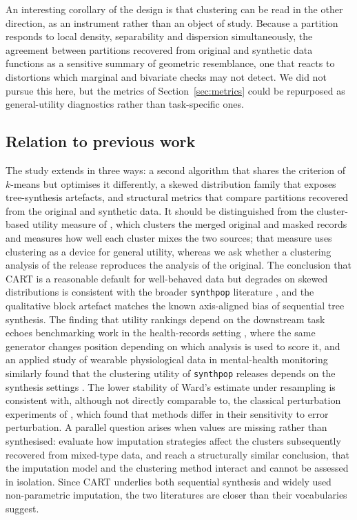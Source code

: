 \documentclass[pdflatex,referee]{sn-jnl}
\begin{document}
An interesting corollary of the design is that clustering can be read in the
other direction, as an instrument rather than an object of study. Because a
partition responds to local density, separability and dispersion
simultaneously, the agreement between partitions recovered from original and
synthetic data functions as a sensitive summary of geometric resemblance, one
that reacts to distortions which marginal and bivariate checks may not detect.
We did not pursue this here, but the metrics of Section~\ref{sec:metrics} could
be repurposed as general-utility diagnostics rather than task-specific ones.

\subsection{Relation to previous work}

The study extends \citet{chen2025} in three ways: a second algorithm that
shares the criterion of $k$-means but optimises it differently, a skewed
distribution family that exposes tree-synthesis artefacts, and structural
metrics that compare partitions recovered from the original and synthetic
data. It should be distinguished from the cluster-based utility measure of
\citet{woo2009}, which clusters the merged original and masked records and
measures how well each cluster mixes the two sources; that measure uses
clustering as a device for general utility, whereas we ask whether a
clustering analysis of the release reproduces the analysis of the original.
The conclusion that CART is a reasonable default for well-behaved data but
degrades on skewed distributions is consistent with the broader
\texttt{synthpop} literature \citep{nowok2016,snoke2018}, and the qualitative
block artefact matches the known axis-aligned bias of sequential tree
synthesis. The finding that utility rankings depend on the downstream task
echoes benchmarking work in the health-records setting
\citep{yan2022,elemam2022}, where the same generator changes position depending
on which analysis is used to score it, and an applied study of wearable
physiological data in mental-health monitoring similarly found that the
clustering utility of \texttt{synthpop} releases depends on the synthesis
settings \citep{vidiella2025}. The lower stability of Ward's estimate under
resampling is consistent with, although not directly comparable to, the
classical perturbation experiments of \citet{milligan1980}, which found that
methods differ in their sensitivity to error perturbation. A parallel question
arises when values are missing rather than synthesised: \citet{aschenbruck2023}
evaluate how imputation strategies affect the clusters subsequently recovered
from mixed-type data, and reach a structurally similar conclusion, that the
imputation model and the clustering method interact and cannot be assessed in
isolation. Since CART underlies both sequential synthesis and widely used
non-parametric imputation, the two literatures are closer than their
vocabularies suggest.
\end{document}
